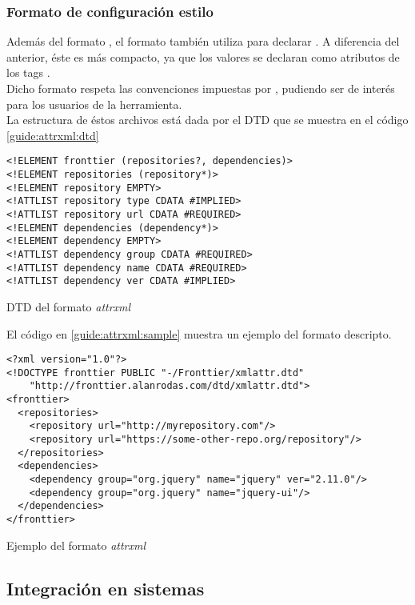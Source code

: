 \subsubsection{Formato de configuración estilo \ivy}
\label{subsubsec:formats:ivy}

Además del formato , el formato  también utiliza \xml 
para declarar \dependencies. A diferencia del anterior, éste es más 
compacto, ya que los valores se declaran como atributos de los tags \xml.\\
Dicho formato respeta las convenciones impuestas por \apache \ivy, pudiendo ser 
de interés para los usuarios de la herramienta.\\
La estructura de éstos archivos está dada por el DTD que se muestra en el código
\ref{guide:attrxml:dtd}

\begin{listing}[ht]
	\begin{verbatim}
<!ELEMENT fronttier (repositories?, dependencies)>
<!ELEMENT repositories (repository*)>
<!ELEMENT repository EMPTY>
<!ATTLIST repository type CDATA #IMPLIED>
<!ATTLIST repository url CDATA #REQUIRED>
<!ELEMENT dependencies (dependency*)>
<!ELEMENT dependency EMPTY>
<!ATTLIST dependency group CDATA #REQUIRED>
<!ATTLIST dependency name CDATA #REQUIRED>
<!ATTLIST dependency ver CDATA #IMPLIED>
	\end{verbatim}
	\caption{DTD del formato \emph{attrxml}}
	\label{guide:attrxml:dtd}
\end{listing}

El código en \ref{guide:attrxml:sample} muestra un ejemplo del formato 
descripto.

\begin{listing}[ht]
	\begin{verbatim}
<?xml version="1.0"?>
<!DOCTYPE fronttier PUBLIC "-/Fronttier/xmlattr.dtd"
    "http://fronttier.alanrodas.com/dtd/xmlattr.dtd">
<fronttier>
  <repositories>
    <repository url="http://myrepository.com"/>
    <repository url="https://some-other-repo.org/repository"/>
  </repositories>	
  <dependencies>
    <dependency group="org.jquery" name="jquery" ver="2.11.0"/>
    <dependency group="org.jquery" name="jquery-ui"/>
  </dependencies>
</fronttier>
	\end{verbatim}
	\caption{Ejemplo del formato \emph{attrxml}}
	\label{guide:attrxml:sample}
\end{listing}


\subsection{Integración en sistemas}
\label{subsec:guide:systems}

